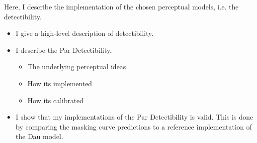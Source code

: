 Here, I describe the implementation of the chosen perceptual models, i.e. the detectibility.
\begin{itemize}
    \item I give a high-level description of detectibility. 
    \item I describe the Par Detectibility.
        \begin{itemize}
            \item The underlying perceptual ideas
            \item How its implemented
            \item How its calibrated
        \end{itemize}
        \item I show that my implementations of the Par Detectibility is valid.
        This is done by comparing the masking curve predictions to a reference implementation of the Dau model.
\end{itemize}
